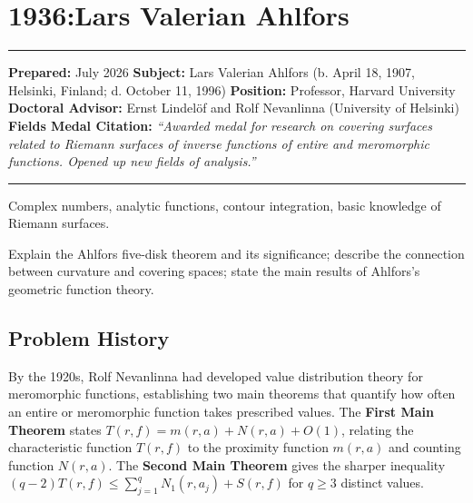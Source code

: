\chapter{1936:Lars Valerian Ahlfors}\label{ch1936larsvalerianahlfors:lars-valerian-ahlfors-fields-medal-1936-a-comprehensive-report}

\begin{center}\rule{0.5\linewidth}{0.5pt}\end{center}

\textbf{Prepared:} July 2026 \textbf{Subject:} Lars Valerian Ahlfors (b.
April 18, 1907, Helsinki, Finland; d. October 11, 1996) \textbf{Position:} Professor, Harvard
University \textbf{Doctoral Advisor:} Ernst Lindel\"{o}f and Rolf Nevanlinna
(University of Helsinki) \textbf{Fields Medal Citation:} \emph{``Awarded
medal for research on covering surfaces related to Riemann surfaces of
inverse functions of entire and meromorphic functions. Opened up new
fields of analysis.''}

\begin{center}\rule{0.5\linewidth}{0.5pt}\end{center}

\begin{prereqs} Complex numbers, analytic functions, contour integration, basic knowledge of Riemann surfaces. \end{prereqs}

\begin{objectives} Explain the Ahlfors five-disk theorem and its significance; describe the connection between curvature and covering spaces; state the main results of Ahlfors's geometric function theory. \end{objectives}

\section{Problem History}

By the 1920s, Rolf Nevanlinna had developed value distribution theory for meromorphic functions, establishing two main theorems that quantify how often an entire or meromorphic function takes prescribed values. The \textbf{First Main Theorem} states $T(r, f) = m(r, a) + N(r, a) + O(1)$, relating the characteristic function $T(r,f)$ to the proximity function $m(r,a)$ and counting function $N(r,a)$. The \textbf{Second Main Theorem} gives the sharper inequality $(q-2)T(r,f) \leq \sum_{j=1}^q N_1(r, a_j) + S(r,f)$ for $q \geq 3$ distinct values.

